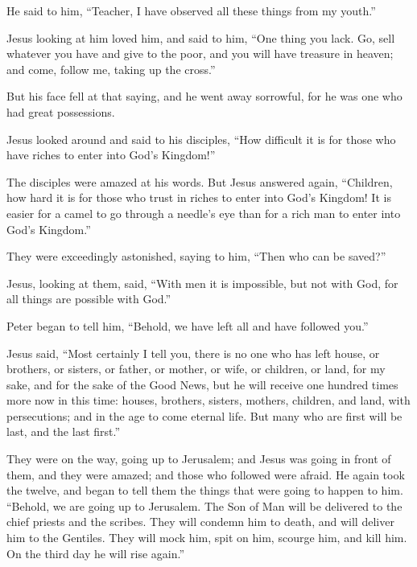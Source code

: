  He said to him, ``Teacher, I have observed all these
things from my youth.''

 Jesus looking at him loved him, and said to him, ``One
thing you lack. Go, sell whatever you have and give to the poor, and you
will have treasure in heaven; and come, follow me, taking up the
cross.''

 But his face fell at that saying, and he went away
sorrowful, for he was one who had great possessions.

 Jesus looked around and said to his disciples, ``How
difficult it is for those who have riches to enter into God's Kingdom!''

 The disciples were amazed at his words. But Jesus
answered again, ``Children, how hard it is for those who trust in riches
to enter into God's Kingdom!  It is easier for a camel to
go through a needle's eye than for a rich man to enter into God's
Kingdom.''

 They were exceedingly astonished, saying to him, ``Then
who can be saved?''

 Jesus, looking at them, said, ``With men it is
impossible, but not with God, for all things are possible with God.''

 Peter began to tell him, ``Behold, we have left all and
have followed you.''

 Jesus said, ``Most certainly I tell you, there is no one
who has left house, or brothers, or sisters, or father, or mother, or
wife, or children, or land, for my sake, and for the sake of the Good
News,  but he will receive one hundred times more now in
this time: houses, brothers, sisters, mothers, children, and land, with
persecutions; and in the age to come eternal life.  But
many who are first will be last, and the last first.''

 They were on the way, going up to Jerusalem; and Jesus
was going in front of them, and they were amazed; and those who followed
were afraid. He again took the twelve, and began to tell them the things
that were going to happen to him.  ``Behold, we are going
up to Jerusalem. The Son of Man will be delivered to the chief priests
and the scribes. They will condemn him to death, and will deliver him to
the Gentiles.  They will mock him, spit on him, scourge
him, and kill him. On the third day he will rise again.''

